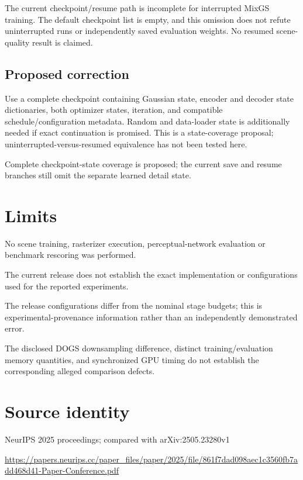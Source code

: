 \documentclass[11pt]{article}
\begin{document}
The current checkpoint/resume path is incomplete for interrupted MixGS training. The default checkpoint list is empty, and this omission does not refute uninterrupted runs or independently saved evaluation weights. No resumed scene-quality result is claimed.

\subsection*{Proposed correction}

Use a complete checkpoint containing Gaussian state, encoder and decoder state dictionaries, both optimizer states, iteration, and compatible schedule/configuration metadata. Random and data-loader state is additionally needed if exact continuation is promised. This is a state-coverage proposal; uninterrupted-versus-resumed equivalence has not been tested here.

Complete checkpoint-state coverage is proposed; the current save and resume branches still omit the separate learned detail state.

\section*{Limits}

No scene training, rasterizer execution, perceptual-network evaluation or benchmark rescoring was performed.\par

The current release does not establish the exact implementation or configurations used for the reported experiments.\par

The release configurations differ from the nominal stage budgets; this is experimental-provenance information rather than an independently demonstrated error.\par

The disclosed DOGS downsampling difference, distinct training/evaluation memory quantities, and synchronized GPU timing do not establish the corresponding alleged comparison defects.\par

\section*{Source identity}

NeurIPS 2025 proceedings; compared with arXiv:2505.23280v1

\url{https://papers.neurips.cc/paper_files/paper/2025/file/861f7dad098aec1c3560fb7add468d41-Paper-Conference.pdf}
\end{document}
